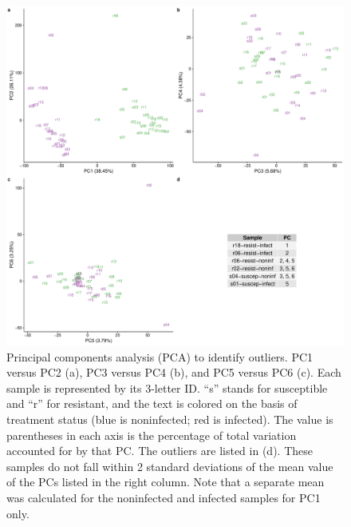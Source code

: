 \documentclass[fleqn,10pt]{wlscirep}
\begin{document}
\begin{figure}[ht]
\centering
\includegraphics[width=\linewidth]{../figure/outliers.pdf}
\caption{
Principal components analysis (PCA) to identify outliers. PC1 versus PC2 (a), PC3 versus PC4 (b), and PC5 versus PC6 (c). Each sample is represented by its 3-letter ID. “s” stands for susceptible and “r” for resistant, and the text is colored on the basis of treatment status (blue is noninfected; red is infected). The value is parentheses in each axis is the percentage of total variation accounted for by that PC. The outliers are listed in (d). These samples do not fall within 2 standard deviations of the mean value of the PCs listed in the right column. Note that a separate mean was calculated for the noninfected and infected samples for PC1 only.
}
\label{fig:outliers}
\end{figure}
\end{document}
